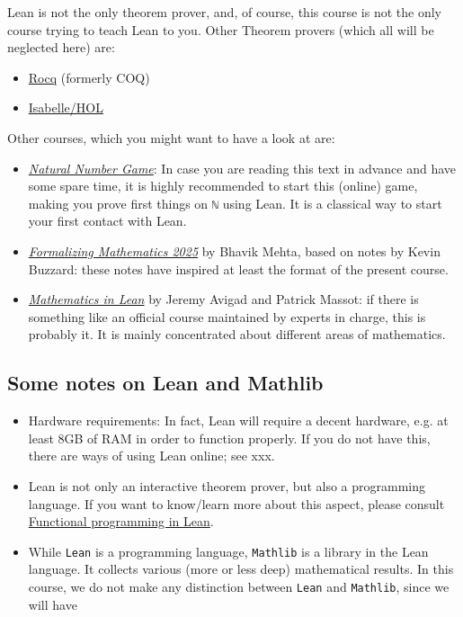 \documentclass{memoir}
\begin{document}
Lean is not the only theorem prover, and, of course, this course is not the only course trying to teach Lean to you. Other Theorem provers (which all will be neglected here) are:

\begin{itemize}
\item \hyperlink{"https://rocq-prover.org/"}{Rocq} (formerly COQ)\item \hyperlink{"https://isabelle.in.tum.de/"}{Isabelle/HOL }
\end{itemize}


Other courses, which you might want to have a look at are:

\begin{itemize}
\item \hyperlink{"https://adam.math.hhu.de/#/g/leanprover-community/nng4"}{\emph{Natural Number Game}}: In case you are reading this text in advance and have some spare time, it is highly recommended to start this (online) game, making you prove first things on \Verb|ℕ| using Lean. It is a classical way to start your first contact with Lean.\item \hyperlink{"https://b-mehta.github.io/formalising-mathematics-notes/"}{\emph{Formalizing Mathematics 2025}} by Bhavik Mehta, based on notes by Kevin Buzzard: these notes have inspired at least the format of the present course.\item \hyperlink{"https://leanprover-community.github.io/mathematics_in_lean/"}{\emph{Mathematics in Lean}} by Jeremy Avigad and Patrick Massot: if there is something like an official course maintained by experts in charge, this is probably it. It is mainly concentrated about different areas of mathematics.
\end{itemize}




\subsection{Some notes on Lean and Mathlib}

\begin{itemize}
\item Hardware requirements: In fact, Lean will require a decent hardware, e.g. at least 8GB of RAM in order to function properly. If you do not have this, there are ways of using Lean online; see xxx.\item Lean is not only an interactive theorem prover, but also a programming language. If you want to know/learn more about this aspect, please consult \hyperlink{"https://lean-lang.org/functional_programming_in_lean/"}{Functional programming in Lean}.\item While \Verb|Lean| is a programming language, \Verb|Mathlib| is a library in the Lean language. It collects various (more or less deep) mathematical results. In this course, we do not make any distinction between \Verb|Lean| and \Verb|Mathlib|, since we will have
\end{itemize}
\end{document}
